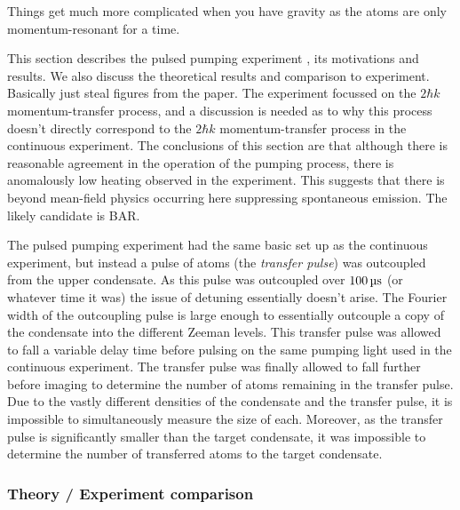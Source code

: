 Things get much more complicated when you have gravity as the atoms are only momentum-resonant for a time.



This section describes the pulsed pumping experiment \citep{Doring:2009}, its motivations and results.  We also discuss the theoretical results and comparison to experiment.  Basically just steal figures from the paper.  The experiment focussed on the $2 \hbar k$ momentum-transfer process, and a discussion is needed as to why this process doesn't directly correspond to the $2 \hbar k$ momentum-transfer process in the continuous experiment.  The conclusions of this section are that although there is reasonable agreement in the operation of the pumping process, there is anomalously low heating observed in the experiment.  This suggests that there is beyond mean-field physics occurring here suppressing spontaneous emission.  The likely candidate is BAR.

\parasep

The pulsed pumping experiment had the same basic set up as the continuous experiment, but instead a pulse of atoms (the \emph{transfer pulse}) was outcoupled from the upper condensate.  As this pulse was outcoupled over $\unit[100]{\micro s}$ (or whatever time it was) the issue of detuning essentially doesn't arise.  The Fourier width of the outcoupling pulse is large enough to essentially outcouple a copy of the condensate into the different Zeeman levels.  This transfer pulse was allowed to fall a variable delay time before pulsing on the same pumping light used in the continuous experiment.  The transfer pulse was finally allowed to fall further before imaging to determine the number of atoms remaining in the transfer pulse.  Due to the vastly different densities of the condensate and the transfer pulse, it is impossible to simultaneously measure the size of each.  Moreover, as the transfer pulse is significantly smaller than the target condensate, it was impossible to determine the number of transferred atoms to the target condensate.

\subsubsection{Theory / Experiment comparison}

